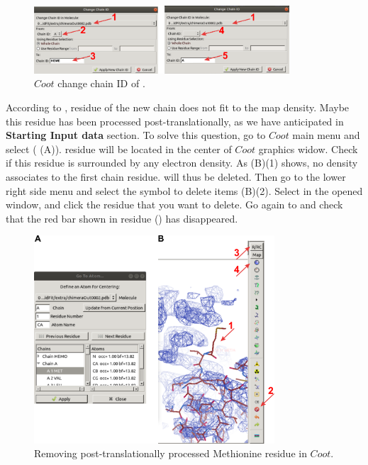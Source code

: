\begin{itemize}
 \begin{figure}[H]
  \centering 
  \captionsetup{width=.7\linewidth} 
  \includegraphics[width=0.85\textwidth]{Images/Fig26}
  \caption{$Coot$ change chain ID of  .}
  \label{fig:coot_change_name_ID}
  \end{figure}
  
  According to ,  residue of the new chain  does not fit to the map density. Maybe this residue has been processed post-translationally, as we have anticipated in \textbf{Starting Input data} section. To solve this question, go to $Coot$ main menu and select  ( (A)).  residue will be located in the center of $Coot$ graphics widow. Check if this residue is surrounded by any electron density. As  (B)(1) shows, no density associates to the first chain residue.  will thus be deleted. Then go to the lower right side menu and select the symbol to delete items (B)(2). Select  in the opened  window, and click the  residue that you want to delete. Go again to  and check that the red bar shown in  residue () has disappeared.
  
  \begin{figure}[H]
  \centering 
  \captionsetup{width=.7\linewidth} 
  \includegraphics[width=0.80\textwidth]{Images/Fig27}
  \caption{Removing post-translationally processed Methionine residue in $Coot$.}
  \label{fig:coot_go_to_atom}
  \end{figure}
  

\end{itemize}
